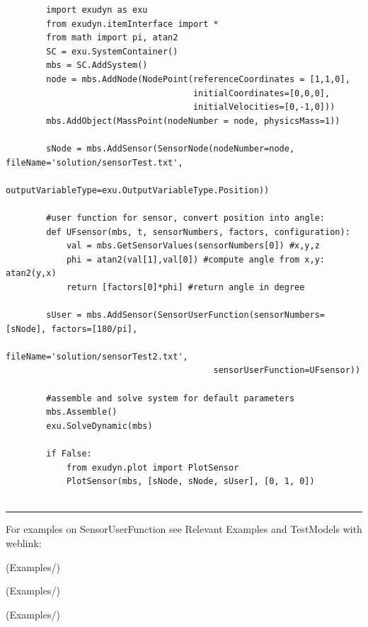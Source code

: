     \pythonstyle\begin{lstlisting}
        import exudyn as exu
        from exudyn.itemInterface import *
        from math import pi, atan2
        SC = exu.SystemContainer()
        mbs = SC.AddSystem()
        node = mbs.AddNode(NodePoint(referenceCoordinates = [1,1,0], 
                                     initialCoordinates=[0,0,0],
                                     initialVelocities=[0,-1,0]))
        mbs.AddObject(MassPoint(nodeNumber = node, physicsMass=1))
        
        sNode = mbs.AddSensor(SensorNode(nodeNumber=node, fileName='solution/sensorTest.txt',
                              outputVariableType=exu.OutputVariableType.Position))

        #user function for sensor, convert position into angle:
        def UFsensor(mbs, t, sensorNumbers, factors, configuration):
            val = mbs.GetSensorValues(sensorNumbers[0]) #x,y,z
            phi = atan2(val[1],val[0]) #compute angle from x,y: atan2(y,x)
            return [factors[0]*phi] #return angle in degree
        
        sUser = mbs.AddSensor(SensorUserFunction(sensorNumbers=[sNode], factors=[180/pi], 
                                         fileName='solution/sensorTest2.txt',
                                         sensorUserFunction=UFsensor))

        #assemble and solve system for default parameters
        mbs.Assemble()
        exu.SolveDynamic(mbs)

        if False:
            from exudyn.plot import PlotSensor
            PlotSensor(mbs, [sNode, sNode, sUser], [0, 1, 0])
        
    \end{lstlisting}
\vspace{6pt}\par\noindent\rule{\textwidth}{0.4pt}
%
\noindent For examples on SensorUserFunction see Relevant Examples and TestModels with weblink:
\bi
\item {} (Examples/)
\item {} (Examples/)
\item {} (Examples/)

